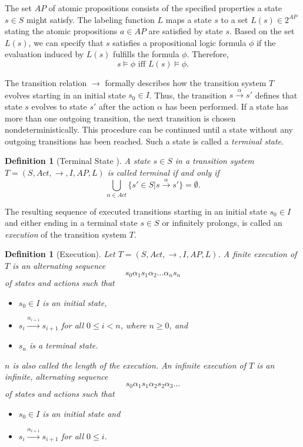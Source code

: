 \documentclass[a4paper, 12pt, twoside]{report}
\theoremstyle{plain}
\newtheorem{definition}[theorem]{Definition}
\begin{document}
	The set $AP$ of atomic propositions consists of the specified properties a state $s \in S$ might satisfy. The labeling function $L$ maps a state $s$ to a set $L(s) \in 2^{AP}$ stating the atomic propositions $a\in AP$ are satisfied by state $s$. Based on the set $L(s)$, we can specify that $s$ satisfies a propositional logic formula $\phi$ if the evaluation induced by $L(s)$ fulfills the formula $\phi$. Therefore,
		\[s \models \phi \text{ iff } L(s) \models \phi.\]
	
	The transition relation $\rightarrow$ formally describes how the transition system $T$ evolves starting in an initial state $s_0 \in I$. Thus, the transition $s \xrightarrow{\alpha} s'$ defines that state $s$ evolves to state $s'$ after the action $\alpha$ has been performed. If a state has more than one outgoing transition, the next transition is chosen nondeterministically. This procedure can be continued until a state without any outgoing transitions has been reached. Such a state is called a \textit{terminal state}.
	
	\begin{definition}[Terminal State \cite{baier2008principles}]\label{def:terminal_state}
		A state $s \in S$ in a transition system $T=(S, Act, \rightarrow, I, AP, L)$ is called \textup{terminal} if and only if 
		\[\bigcup_{\alpha \in Act} \{s'\in S | s \xrightarrow{\alpha} s'\} = \emptyset.\]
	\end{definition}
	
	The resulting sequence of executed transitions starting in an initial state $s_0 \in I$ and either ending in a terminal state $s \in S$ or infinitely prolongs, is called an \textit{execution} of the transition system $T$.
	
	\begin{definition}[Execution]\label{def:execution}
		Let $T=(S, Act, \rightarrow, I, AP, L)$. A \textup{finite execution} 
		of $T$ is an alternating sequence \[s_0 \alpha_1 s_1 \alpha_2 \dots \alpha_n s_n\] of states and actions such that 
		\begin{itemize}
			\item $s_0 \in I$ is an initial state,
			\item $s_i \xrightarrow{\alpha_{i+1}} s_{i+1}$ for all $0 \leq i < n$, where $n \geq 0$, and
			\item $s_n$ is a terminal state.
		\end{itemize}  
		$n$ is also called the \textup{length} of the execution.
		An \textup{infinite execution} of $T$ is an infinite, alternating sequence \[s_0 \alpha_1 s_1 \alpha_2 s_2 \alpha_3 \dots \] of states and actions such that
		\begin{itemize}
			\item $s_0 \in I$ is an initial state and
			\item $s_i \xrightarrow{\alpha_{i+1}} s_{i+1}$ for all $0 \leq i$.
		\end{itemize} 
	\end{definition}
	
\end{document}

